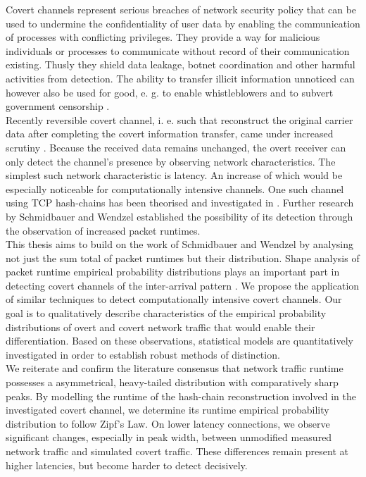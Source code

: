\documentclass[12pt,a4paper,automark, toc=bib]{scrreprt}
\theoremstyle{definition}
\begin{document}
		Covert channels represent serious breaches of network security policy that can be used to  undermine the confidentiality of user data by enabling the communication of processes with conflicting privileges. They provide a way for malicious individuals or processes to communicate without record of their communication existing. Thusly they shield data leakage, botnet coordination and other harmful activities from detection. The ability to transfer illicit information unnoticed can however also be used for good, e. g. to enable whistleblowers and to subvert government censorship  \cite{Wendzel2015}. \\
		Recently reversible covert channel, i. e. such that reconstruct the original carrier data after completing the covert information transfer, came under increased scrutiny  \cite{Mazurczyk2019}. Because the received data remains unchanged, the overt receiver can only detect the channel's presence by observing network characteristics. The simplest such network characteristic is latency. An increase of which would be especially noticeable for computationally intensive channels. One such channel using TCP hash-chains has been theorised and investigated in  \cite{Keller2021}. Further research by Schmidbauer and Wendzel  \cite{Schmidbauer2021, Schmidbauer} established the possibility of its detection through the observation of increased packet runtimes.\\
		This thesis aims to build on the work of Schmidbauer and Wendzel by analysing not just the sum total of packet runtimes but their distribution. Shape analysis of packet runtime empirical probability distributions plays an important part in detecting covert channels of the inter-arrival pattern  \cite{Berk2005, Cabuk2009}. We propose the application of similar techniques to detect computationally intensive covert channels. Our goal is to qualitatively describe characteristics of the empirical probability distributions of overt and covert network traffic that would enable their differentiation. Based on these observations, statistical models are quantitatively investigated in order to establish robust methods of distinction. \\
		We reiterate and confirm the literature consensus that network traffic runtime possesses a asymmetrical, heavy-tailed distribution with comparatively sharp peaks. By modelling the runtime of the hash-chain reconstruction involved in the investigated covert channel, we determine its runtime empirical probability distribution to follow Zipf's Law. On lower latency connections, we observe significant changes, especially in peak width, between unmodified measured network traffic and simulated covert traffic. These differences remain present at higher latencies, but become harder to detect decisively. \pagebreak
\end{document}
